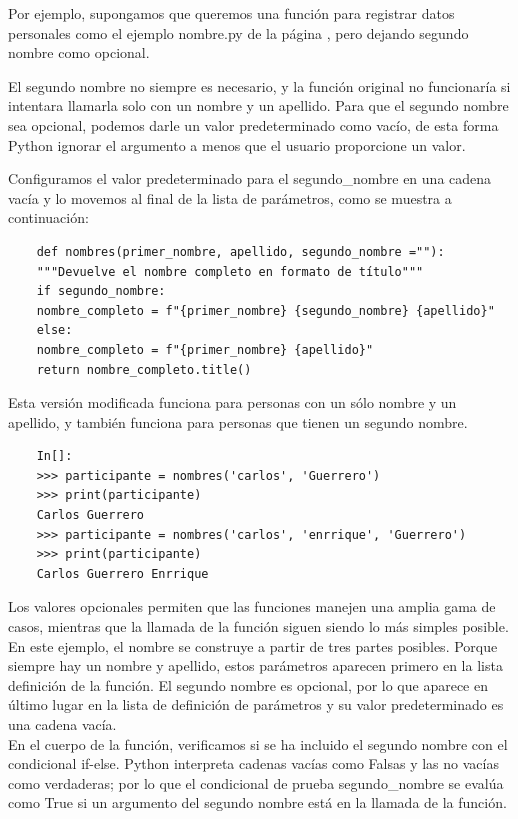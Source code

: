 Por ejemplo, supongamos que queremos una función para registrar datos personales como el ejemplo {\ttfamily nombre.py} de la página \pageref{arg_opcional},  pero dejando segundo nombre como opcional. 

El segundo nombre no siempre es necesario, y la función original no funcionaría si intentara llamarla solo con un nombre y un apellido.
Para que el segundo nombre sea opcional, podemos darle un valor predeterminado como vacío, de esta forma Python ignorar el argumento a menos que el usuario proporcione un valor. 

Configuramos el valor predeterminado para el {\ttfamily segundo\_nombre} en una cadena vacía y lo movemos al final de la
lista de parámetros, como se muestra a continuación:


\hspace{-2.3cm}{\ttfamily\scriptsize nombres.py}
\vspace{-0.508cm}
\begin{lstlisting}
	def nombres(primer_nombre, apellido, segundo_nombre =""):
	"""Devuelve el nombre completo en formato de título"""
	if segundo_nombre:
	nombre_completo = f"{primer_nombre} {segundo_nombre} {apellido}"
	else:
	nombre_completo = f"{primer_nombre} {apellido}"
	return nombre_completo.title()
\end{lstlisting}

Esta versión modificada funciona para personas con un sólo nombre y un apellido, y también funciona para personas que tienen un segundo nombre.

\begin{lstlisting}
	In[]:
	>>> participante = nombres('carlos', 'Guerrero')
	>>> print(participante)
	Carlos Guerrero
	>>> participante = nombres('carlos', 'enrrique', 'Guerrero')
	>>> print(participante)
	Carlos Guerrero Enrrique
\end{lstlisting}


Los valores opcionales permiten que las funciones manejen una amplia gama de casos, mientras que la llamada de la función siguen 
siendo lo más simples posible. En este ejemplo, el nombre se construye a partir de tres partes posibles. Porque
siempre hay un nombre y apellido, estos parámetros aparecen primero en la lista
definición de la función. El segundo nombre es opcional, por lo que aparece en último lugar en la lista de 
definición de parámetros  y su valor predeterminado es una cadena vacía.\\

En el cuerpo de la función, verificamos si se ha incluido el segundo nombre con el condicional {\ttfamily if-else}.
Python interpreta cadenas vacías como Falsas y las no vacías como verdaderas; por lo que el condicional de prueba {\ttfamily  segundo\_nombre}  se evalúa como {\ttfamily True} si un argumento del segundo nombre está en la llamada de la función. 

